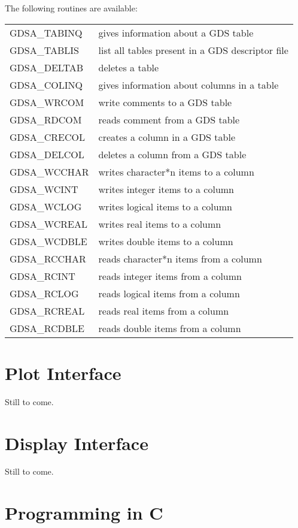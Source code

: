The following routines are available:

\begin{tabular}{l l }
GDSA\_TABINQ&gives information about a GDS table\\
GDSA\_TABLIS&list all tables present in a GDS descriptor file\\
GDSA\_DELTAB&deletes a table\\
GDSA\_COLINQ&gives information about columns in a table\\
GDSA\_WRCOM &write comments to a GDS table\\
GDSA\_RDCOM &reads comment from a GDS table\\
GDSA\_CRECOL&creates a column in a GDS table\\
GDSA\_DELCOL&deletes a column from a GDS table\\
GDSA\_WCCHAR&writes character*n items to a column\\
GDSA\_WCINT &writes integer     items to a column\\
GDSA\_WCLOG &writes logical     items to a column\\
GDSA\_WCREAL&writes real        items to a column\\
GDSA\_WCDBLE&writes double      items to a column\\
GDSA\_RCCHAR&reads  character*n items from a column\\
GDSA\_RCINT &reads  integer     items from a column\\
GDSA\_RCLOG &reads  logical     items from a column\\
GDSA\_RCREAL&reads  real        items from a column\\
GDSA\_RCDBLE&reads  double      items from a column\\
\end{tabular}

\chapter{Plot Interface}

Still to come.

\chapter{Display Interface}

Still to come.

\chapter{Programming in C}

